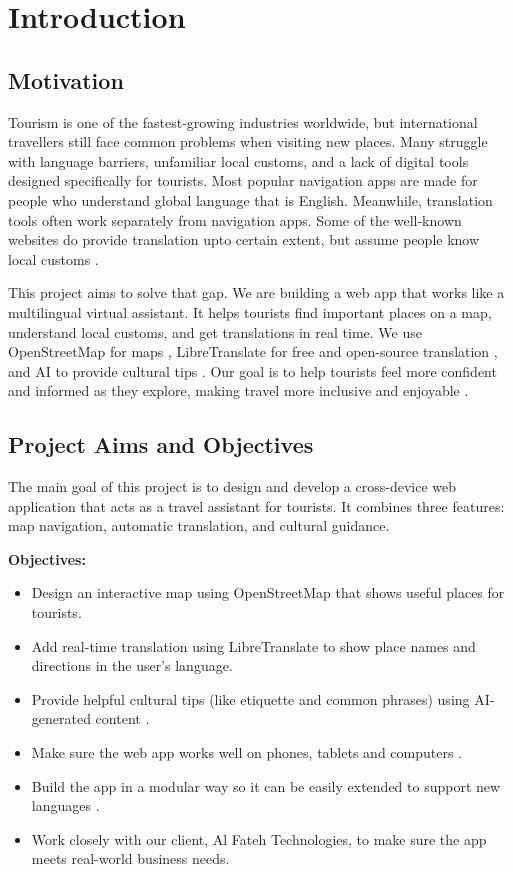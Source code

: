 \chapter{Introduction}

\section{Motivation}

Tourism is one of the fastest-growing industries worldwide, but international travellers still face common problems when visiting new places. Many struggle with language barriers, unfamiliar local customs, and a lack of digital tools designed specifically for tourists. Most popular navigation apps are made for people who understand global language that is English. Meanwhile, translation tools often work separately from navigation apps. Some of the well-known websites do provide translation upto certain extent, but assume people know local customs \cite{navUX,localizationUX}.

This project aims to solve that gap. We are building a web app that works like a multilingual virtual assistant. It helps tourists find important places on a map, understand local customs, and get translations in real time. We use OpenStreetMap for maps \cite{osm}, LibreTranslate for free and open-source translation \cite{libretranslate}, and AI to provide cultural tips \cite{cultureai}. Our goal is to help tourists feel more confident and informed as they explore, making travel more inclusive and enjoyable \cite{inclusiveTourism}.

\section{Project Aims and Objectives}

The main goal of this project is to design and develop a cross-device web application that acts as a travel assistant for tourists. It combines three features: map navigation, automatic translation, and cultural guidance.

\textbf{Objectives:}
\begin{itemize}
  \item Design an interactive map using OpenStreetMap that shows useful places for tourists.
  \item Add real-time translation using LibreTranslate to show place names and directions in the user’s language.
  \item Provide helpful cultural tips (like etiquette and common phrases) using AI-generated content \cite{gpt_culturetips}.
  \item Make sure the web app works well on phones, tablets and computers \cite{responsiveDesign}.
  \item Build the app in a modular way so it can be easily extended to support new languages \cite{modularApps}.
  \item Work closely with our client, Al Fateh Technologies, to make sure the app meets real-world business needs.
\end{itemize}

